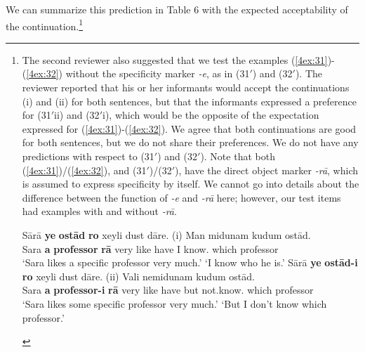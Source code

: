 \documentclass[output=paper]{langsci/langscibook}
\begin{document}
We can summarize this prediction in Table 6 with the expected acceptability of the continuation.\footnote{The second reviewer also suggested that we test the examples (\ref{4ex:31})-(\ref{4ex:32}) without the specificity marker {\emph{-e}}, as in (31$'$) and (32$'$). The reviewer reported that his or her informants would accept the continuations (i) and (ii) for both sentences, but that the informants expressed a preference for (31$'$ii) and (32$'$i), which would be the opposite of the expectation expressed for (\ref{4ex:31})-(\ref{4ex:32}). We agree that both continuations are good for both sentences, but we do not share their preferences. We do not have any predictions with respect to (31$'$) and (32$'$). Note that both (\ref{4ex:31})/(\ref{4ex:32}), and (31$'$)/(32$'$), have the direct object marker {\emph{-rā}}, which is assumed to express specificity by itself. We cannot go into details about the difference between the function of {\emph{-e}} and {\emph{-rā}} here; however, our test items had examples with and without {\emph{-rā}}.

\vspace*{-2mm}
\begin{exe}
\gll	Sārā		{\bf{ye}}	{\bf{ostād}}	{\bf{ro}}	xeyli dust  dāre. 	\hspace*{1.25cm}(i) 	Man midunam   kudum ostād. \\
         Sara 	{\bf{a}}	{\bf{professor}}	{\bf{rā}}	very  like   have			  		{}	I     know.{} which professor \\
\glt	`Sara likes a specific professor very much.'					\hspace*{0.75cm}	`I know who he is.'
\gll	Sārā		{\bf{ye}}	{\bf{ostād-i}} 	{\bf{ro}}   	xeyli dust dāre. 		\hspace*{1cm}(ii)	Vali nemidunam     kudum ostād. \\
	Sara		{\bf{a}}	{\bf{professor-i}}	{\bf{rā}} very  like  have				{}	but  not.know.{} which  professor \\
\glt	`Sara likes some specific professor very much.'					\hspace*{0.35cm}	`But I don't know which professor.'
\end{exe}
}
\end{document}
